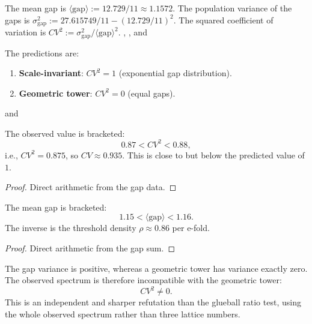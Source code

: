 \begin{definition}
The mean gap is $\langle \text{gap} \rangle := 12.729/11 \approx 1.1572$.
The population variance of the gaps is $\sigma_{\text{gap}}^2 := 27.615749/11 - (12.729/11)^2$.
The squared coefficient of variation is $CV^2 := \sigma_{\text{gap}}^2 / \langle \text{gap} \rangle^2$.
, , and 
\end{definition}

\begin{definition}
The predictions are:
\begin{enumerate}
\item \textbf{Scale-invariant}: $CV^2 = 1$ (exponential gap distribution).
\item \textbf{Geometric tower}: $CV^2 = 0$ (equal gaps).
\end{enumerate}
 and 
\end{definition}

\begin{theorem}
The observed value is bracketed:
\begin{equation}
0.87 < CV^2 < 0.88 ,
\end{equation}
i.e., $CV^2 = 0.875$, so $CV \approx 0.935$. This is close to but below the predicted value of $1$.
\end{theorem}

\begin{proof}
Direct arithmetic from the gap data.
\end{proof}

\begin{theorem}
The mean gap is bracketed:
\begin{equation}
1.15 < \langle \text{gap} \rangle < 1.16 .
\end{equation}
The inverse is the threshold density $\rho \approx 0.86$ per e-fold.
\end{theorem}

\begin{proof}
Direct arithmetic from the gap sum.
\end{proof}

\begin{theorem}
The gap variance is positive, whereas a geometric tower has variance exactly zero. The observed spectrum is therefore incompatible with the geometric tower:
\begin{equation}
CV^2 \neq 0 .
\end{equation}
This is an independent and sharper refutation than the glueball ratio test, using the whole observed spectrum rather than three lattice numbers.
\end{theorem}

